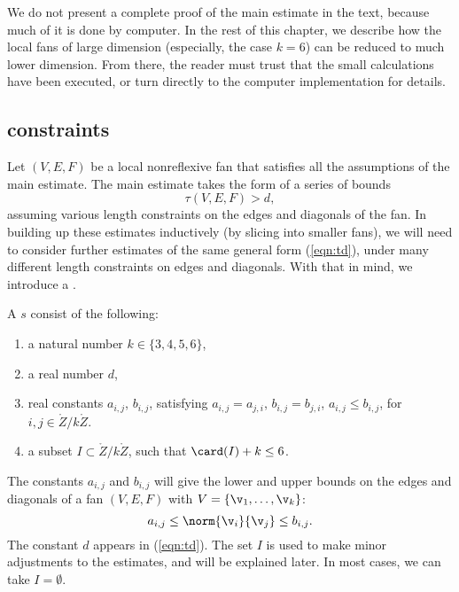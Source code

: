 We do not present a complete proof of the main estimate in the text,
because much of it is done by computer.  In the rest of this chapter,
we describe how the local fans of large dimension (especially, the case $k=6$)
can be reduced to much lower dimension.  From there, the reader must
trust that the small calculations have been executed, or turn directly to
the computer implementation for details.

\subsection{constraints}

Let $(V,E,F)$ be a local nonreflexive fan that satisfies all the assumptions
of the main estimate.  The main estimate takes the form of a series of
bounds
\begin{equation}\label{eqn:td}
\tau(V,E,F) > d,
\end{equation}
assuming various length constraints on the edges and diagonals of the fan.
In building up these estimates inductively (by slicing into
smaller fans), we will need to consider further estimates of the same
general form (\ref{eqn:td}), under many different length constraints on
edges and diagonals.
With that in mind, we introduce a .

\begin{definition}
A  $s$ consist of the following:
\begin{enumerate}
\item a natural number $k\in \{3,4,5,6\}$,
\item a real number $d$,
\item real constants $a_{i,j}$, $b_{i,j}$,  satisfying
   $a_{i,j} = a_{j,i}$, $b_{i,j}=b_{j,i}$, $a_{i,j}\le b_{i,j}$, for $i,j\in\ring{Z}/k\ring{Z}$.
\item a subset $I\subset \ring{Z}/k\ring{Z}$, such that $\card(I)+k\le 6$.
\end{enumerate}
\end{definition}

The constants $a_{i,j}$ and $b_{i,j}$ will give the lower and upper bounds
on the edges and diagonals of a fan $(V,E,F)$ with $V=\{\v_1,\ldots,\v_k\}$:
\[
a_{i,j}\le \norm{\v_i}{\v_j} \le b_{i,j}.
\]
The constant $d$ appears in (\ref{eqn:td}).    The set $I$ is used to
make minor adjustments to the estimates, and will be explained later.
In most cases, we can take $I=\emptyset$.

